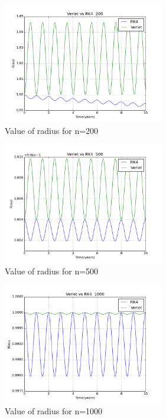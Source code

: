 \documentclass[11pt,a4wide]{article}
\begin{document}
\begin{figure}[H]
\begin{subfigure}[b]{0.5\linewidth}
    \centering
    \includegraphics[width=70mm]{200.png}
    \caption{Value of radius for n=200} 
    \label{fig7:a} 
    \vspace{4ex}
\end{subfigure}%
\begin{subfigure}[b]{0.5\linewidth}
    \centering
    \includegraphics[width=70mm]{500.png}
    \caption{Value of radius for n=500} 
    \label{fig7:b} 
    \vspace{4ex}
\end{subfigure}
\begin{subfigure}[b]{0.5\linewidth}
    \centering
    \includegraphics[width=70mm]{1000.png}
    \caption{Value of radius for n=1000} 
    \label{fig7:c} 
    \vspace{4ex}
\end{subfigure}%
\begin{subfigure}[b]{0.5\linewidth}

\end{subfigure}
\end{figure}
\end{document}
